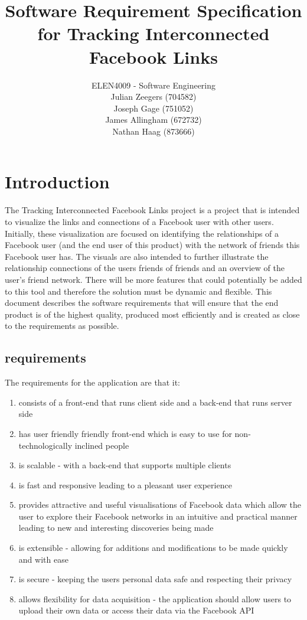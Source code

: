 \documentclass[10pt,onecolumn]{article}
\title{\vspace{-4.2cm}Software Requirement Specification for Tracking Interconnected Facebook Links }
\author{ ELEN4009 - Software Engineering\\ Julian Zeegers (704582) \\  Joseph Gage (751052)\\ James Allingham (672732) \\ Nathan Haag (873666)}
\begin{document}
\date{\vspace{-5ex}}
\maketitle
\pagestyle{plain}
\setcounter{page}{1}



\section{Introduction}
The Tracking Interconnected Facebook Links project is a project that  is intended to visualize the links and connections of a Facebook user with other users. Initially, these visualization are focused on identifying the relationships of a Facebook user (and the end user of this product) with the network of friends this Facebook user has. The visuals are also intended to further illustrate the relationship connections of the users friends of friends and an overview of the user's friend network. There will be more features that could potentially be added to this tool and therefore the solution must be dynamic and flexible. This document describes the software requirements that will ensure that the end product is of the highest quality, produced most efficiently and is created as close to the requirements as possible.

\subsection{requirements}

The requirements for the application are that it:
\begin{enumerate}
\item consists of a front-end that runs client side and a back-end that runs server side 
\item has user friendly friendly front-end which is easy to use for non-technologically inclined people
\item is scalable - with a back-end that supports multiple clients
\item is fast and responsive leading to a pleasant user experience
\item provides attractive and useful visualisations of Facebook data which allow the user to explore their Facebook networks in an intuitive and practical manner leading to new and interesting discoveries being made
\item is extensible - allowing for additions and modifications to be made quickly and with ease
\item is secure - keeping the users personal data safe and respecting their privacy
\item allows flexibility for data acquisition - the application should allow users to upload their own data or access their data via the Facebook API
\end{enumerate}
\end{document}
